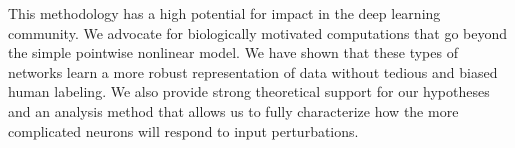 This methodology has a high potential for impact in the deep learning community. We advocate for biologically motivated computations that go beyond the simple pointwise nonlinear model. We have shown that these types of networks learn a more robust representation of data without tedious and biased human labeling. We also provide strong theoretical support for our hypotheses and an analysis method that allows us to fully characterize how the more complicated neurons will respond to input perturbations.